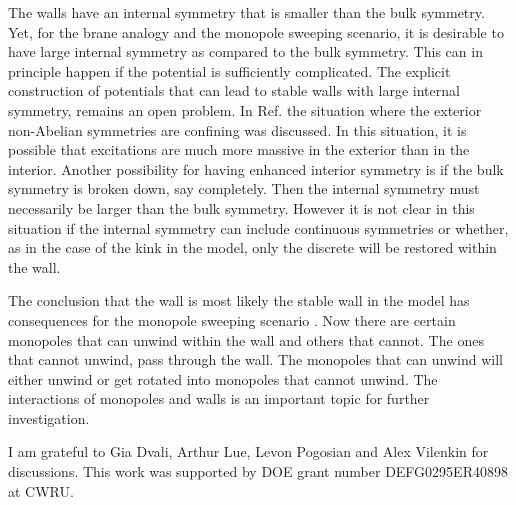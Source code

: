 \documentclass[a4paper,prd,nofootinbib,twocolumn,showpacs]{revtex4}
\begin{document}
The \coordHE{} walls have an internal symmetry that is smaller than 
the bulk symmetry. Yet, for the brane analogy and the monopole 
sweeping scenario, it is desirable to have large internal symmetry 
as compared to the bulk symmetry. This can in principle happen if 
the potential \coordHE{} is sufficiently complicated. The explicit 
construction of potentials that can lead to stable walls with 
large internal symmetry, remains an open problem. In Ref.
\cite{DvaShi97,DvaVil02} the situation where the exterior
non-Abelian symmetries are confining was discussed. In this situation, 
it is possible that excitations are much more massive in 
the exterior than in the interior. Another possibility for having 
enhanced interior symmetry is if the bulk symmetry is broken down, 
say completely. Then the internal symmetry must necessarily be larger 
than the bulk symmetry. However it is not clear in this situation 
if the internal symmetry can include continuous symmetries or whether, 
as in the case of the \coordHE{} kink in the \coordHE{} model, only 
the discrete \coordHE{} will be restored within the wall. 

The conclusion that the \coordHE{} wall is most likely the stable
wall in the model has consequences for the monopole sweeping
scenario \cite{PogVac00b}. Now there are certain monopoles that
can unwind within the wall and others that cannot. The ones
that cannot unwind, pass through the wall. The monopoles that
can unwind will either unwind or get rotated into monopoles
that cannot unwind. The interactions of monopoles and walls
is an important topic for further investigation.

\begin{acknowledgments} 
I am grateful to Gia Dvali, Arthur Lue, Levon Pogosian and 
Alex Vilenkin for discussions.
This work was supported by DOE grant number DEFG0295ER40898 
at CWRU.

\end{acknowledgments}
\end{document}
